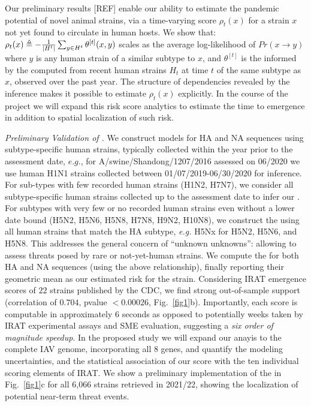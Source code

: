 \documentclass[onecolumn, compsoc,12pt]{IEEEtran}
\begin{document}
%
Our preliminary results [REF] enable our ability to estimate the pandemic potential of novel animal strains, via a  time-varying \erisk score $\rho_t(x)$ for a strain $x$ not yet found to circulate in human hosts. We show that: $
\rho_t(x) \triangleq -\frac{1}{\left\lvert H^t \right\rvert} \sum_{y \in H^t} \theta^{[t]}(x,y)
$ scales as the average log-likelihood of $Pr(x \rightarrow y)$ where $y$ is any human strain of a similar subtype to $x$, and  $\theta^{[t]}$ is the \qdist informed by the \enet computed from recent human strains $H_t$ at time $t$ of the same subtype as $x$, observed over the past year. The structure of dependencies revealed by the \enet inference makes it possible to estimate $\rho_t(x)$ explicitly. In the course of the project we will expand this risk score analytics to estimate the time to emergence in addition to spatial localization of such risk.
 
\textit{Preliminary Validation of \bnd.} We construct \enet models for HA and NA sequences using subtype-specific human strains, typically collected within the  year prior to the assessment date, $e.g.$,   for A/swine/Shandong/1207/2016 assessed on 06/2020 we  use human H1N1 strains collected  between 01/07/2019-06/30/2020 for  \enet inference. For sub-types with few  recorded human strains (H1N2, H7N7), we consider all subtype-specific human strains collected up to the  assessment date  to infer our \enet. For subtypes with very few or no recorded human strains even without a lower date bound (H5N2, H5N6, H5N8, H7N8, H9N2, H10N8), we construct the \enet using all human strains that match the HA subtype, \textit{e.g.} H5Nx for H5N2, H5N6, and H5N8. This addresses the general concern of ``unknown unknowns'': allowing  \enet to assess  threats posed by rare or not-yet-human strains. We  compute the \erisk for both HA and NA sequences (using the above relationship),  finally reporting their geometric mean as our estimated risk for the strain. Considering IRAT emergence scores of $22$ strains published by the CDC, we find strong out-of-sample support  (correlation of $0.704$, pvalue $<0.00026$, Fig.~\ref{fig1}b). Importantly, each \erisk score  is  computable in approximately $6$ seconds as opposed to potentially weeks taken by IRAT experimental assays and SME evaluation, suggesting a \textit{six order of magnitude speedup}. In the proposed study we will expand our anayis to the complete IAV genome, incorporating all 8 genes, and quantify the modeling uncertainties, and the statistical association of our score with the ten individual scoring elements of IRAT. We show a preliminary implementation of the \bnd in Fig.~\ref{fig1}c for all 6,066 strains retrieved in 2021/22, showing the localization of potential near-term threat events.
\end{document}

